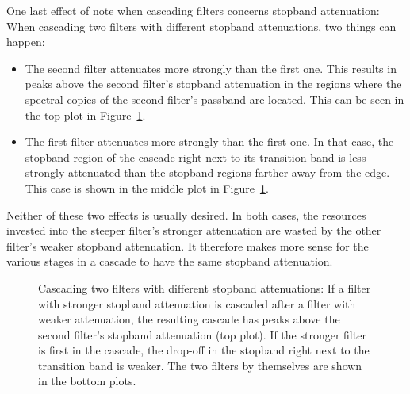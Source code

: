 One last effect of note when cascading filters concerns stopband attenuation:
When cascading two filters with different stopband attenuations, two things
can happen:
\begin{itemize}\tightlist
    \item
        The second  filter attenuates more  strongly than the  first one. This
        results  in  peaks  above  the second  filter's  stopband  attenuation
        in  the regions  where  the  spectral copies  of  the second  filter's
        passband  are   located. This  can  be   seen  in  the  top   plot  in
        Figure~\ref{fig:fdesign:cascade:ast_demo}.
    \item
        The first filter attenuates more  strongly than the first one. In that
        case, the stopband region of the  cascade right next to its transition
        band is  less strongly  attenuated than  the stopband  regions farther
        away  from  the  edge. This  case  is shown  in  the  middle  plot  in
        Figure~\ref{fig:fdesign:cascade:ast_demo}.
\end{itemize}
Neither of these two effects is usually desired.  In both cases, the resources
invested  into the  steeper filter's  stronger attenuation  are wasted  by the
other filter's weaker stopband attenuation. It  therefore makes more sense for
the various  stages in  a cascade  to have the  same stopband  attenuation.

\begin{figure}
    \centering
    
    \caption[Cascade: Stopband Attenuation]{%
        Cascading  two  filters  with different  stopband  attenuations: If  a
        filter with stronger  stopband attenuation is cascaded  after a filter
        with weaker  attenuation, the  resulting cascade  has peaks  above the
        second  filter's  stopband  attenuation (top  plot). If  the  stronger
        filter is  first in the  cascade, the  drop-off in the  stopband right
        next to the  transition band is weaker. The two  filters by themselves
        are shown in the bottom plots.%
    }
    \label{fig:fdesign:cascade:ast_demo}
\end{figure}


